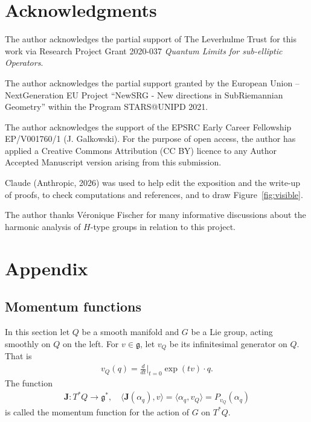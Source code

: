 \documentclass[11pt]{amsart}
\theoremstyle{plain}
\theoremstyle{definition}
\theoremstyle{remark}
\numberwithin{equation}{section}
\def\fg{\mathfrak{g}}
\def\ddt{\frac{d}{dt}\big|_{t=0}}
\numberwithin{equation}{section}
\begin{document}
\section{Acknowledgments}
The author acknowledges the partial support of The Leverhulme Trust for this work via Research Project
Grant 2020-037 \textit{Quantum Limits for sub-elliptic Operators}.

The author acknowledges the partial support granted by the European Union –
NextGeneration EU Project ``NewSRG - New directions in SubRiemannian
Geometry” within the Program STARS@UNIPD 2021.

The author acknowledges the support of the EPSRC Early Career Fellowship EP/V001760/1 (J. Galkowski). For the purpose of open access, the author has applied a Creative Commons Attribution (CC BY) licence to any Author Accepted Manuscript version arising from this submission.

Claude (Anthropic, 2026) was used to help edit the exposition and the write-up of proofs, to check computations and references, and to draw Figure~\ref{fig:visible}.

The author thanks V\'{e}ronique Fischer for many informative discussions about the harmonic analysis of $H$-type groups in relation to this project. 
\section{Appendix}\label{s:appendix}

\subsection{Momentum functions}\label{momentumFunctions}
In this section  let $Q$ be a smooth manifold and $G$ be a Lie group, acting smoothly on $Q$ on the left. For $v\in \fg$, let $v_Q$ be its infinitesimal generator on $Q$. That is
\begin{align*}
	v_Q(q)=\ddt \exp(tv)\cdot q.
\end{align*} The function
\begin{align*}
	\mathbf{J}: T^*Q \to \fg^*, \quad  \langle\mathbf{J}(\alpha_q), v\rangle=\langle \alpha_q, v_Q\rangle=P_{v_Q}(\alpha_q)
\end{align*}
is called the momentum function for the action of $G$ on $T^*Q$. 
\end{document}
